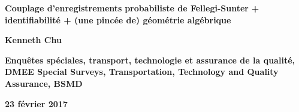 \documentclass{beamer}
\begin{document}
\addtocounter{framenumber}{-1}
{
\begin{frame}[plain]

\begin{center}


\vskip 3.0cm
\textbf{\huge\color{titlefontblue}Couplage d'enregistrements}
\vskip 0.1cm
\textbf{\huge\color{titlefontblue}probabiliste de Fellegi-Sunter}
\vskip 0.1cm
\textbf{\large\color{titlefontblue}+ identifiabilit\'e + (une pinc\'ee de) g\'eom\'etrie alg\'ebrique}

\vskip 0.5cm
\textbf{\large\color{titlefontcolour}Kenneth Chu}

\vskip 0.2cm
\textbf{\scriptsize\color{titlefontcolour}Enqu\^{e}tes sp\'{e}ciales,
transport, technologie et assurance de la qualit\'{e}, DMEE
\vskip -0.1cm
Special Surveys, Transportation, Technology and Quality Assurance, BSMD}

\vskip 0.2cm
\textbf{\color{titlefontcolour}23 f\'evrier 2017} 

\end{center}

\end{frame}
}

\end{document}

